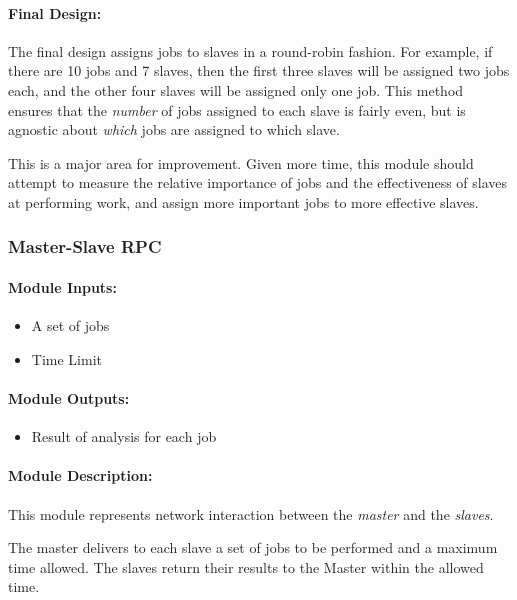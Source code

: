 \documentclass[pdftex,12pt,a4paper]{article}
\begin{document}
\paragraph{Final Design:\\}
The final design assigns jobs to slaves in a round-robin fashion. For example, if there are 10 jobs and 7 slaves, then the first three slaves will be assigned two jobs each, and the other four slaves will be assigned only one job. This method ensures that the \emph{number} of jobs assigned to each slave is fairly even, but is agnostic about \emph{which} jobs are assigned to which slave.

This is a major area for improvement. Given more time, this module should attempt to measure the relative importance of jobs and the effectiveness of slaves at performing work, and assign more important jobs to more effective slaves.

\subsubsection{Master-Slave RPC}

\paragraph{Module Inputs:}
\begin{itemize}
\item A set of jobs
\item Time Limit
\end{itemize}

\paragraph{Module Outputs:}
\begin{itemize}
\item Result of analysis for each job
\end{itemize}

\paragraph{Module Description:\\}
This module represents network interaction between the \emph{master} and the \emph{slaves}.

The master delivers to each slave a set of jobs to be performed and a maximum time allowed. The slaves return their results to the Master within the allowed time.
\end{document}
